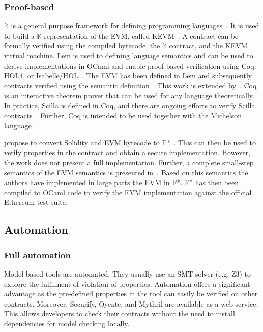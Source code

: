 \subsubsection{Proof-based}
$\mathbb{K}$ is a general purpose framework for defining programming languages~\cite{Rosu2007}. It is used to build a $\mathbb{K}$ representation of the EVM, called KEVM~\cite{Hildenbrandt2017}. 
A contract can be formally verified using the compiled bytecode, the $\mathbb{K}$ contract, and the KEVM virtual machine. 
Lem is used to defining language semantics and can be used to derive implementations in OCaml and enable proof-based verification using Coq, HOL4, or Isabelle/HOL~\cite{Mulligan2014}. The EVM has been defined in Lem and subsequently contracts verified using the semantic definition~\cite{Hirai2017}. This work is extended by~\cite{Amani2018}. 
Coq is an interactive theorem prover that can be used for any language theoretically. In practice, Scilla is defined in Coq, and there are ongoing efforts to verify Scilla contracts~\cite{Sergey2018}. Further, Coq is intended to be used together with the Michelson language~\cite{DynamicLedgerSolutions2017}.

\citeauthor{Bhargavan2016} propose to convert Solidity and EVM bytecode to F*~\cite{Bhargavan2016}. This can then be used to verify properties in the contract and obtain a secure implementation. However, the work does not present a full implementation.
Further, a complete small-step semantics of the EVM semantics is presented in~\cite{Grishchenko2018}. Based on this semantics the authors have implemented in large parts the EVM in F*. F* has then been compiled to OCaml code to verify the EVM implementation against the official Ethereum test suite.

\subsection{Automation} 
\subsubsection{Full automation}
Model-based tools are automated. They usually use an SMT solver (e.g. Z3) to explore the fulfilment of violation of properties. Automation offers a significant advantage as the pre-defined properties in the tool can easily be verified on other contracts. Moreover, Securify, Oyente, and Mythril are available as a web-service. This allows developers to check their contracts without the need to install dependencies for model checking locally.

